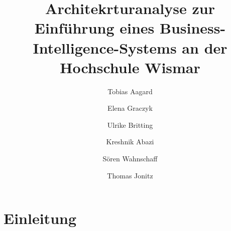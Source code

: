 \documentclass{../tex/hswthesis-wi}
\author{Tobias Aagard\and Elena Graczyk\and Ulrike Britting\and Kreshnik Abazi\and Sören Wahnschaff\and Thomas Jonitz}
\title{Architekrturanalyse zur Einführung eines Business-Intelligence-Systems an der Hochschule Wismar}
\date{\cc{Wismar, \today}}
\begin{document}
\maketitle

\section{Einleitung}
\lipsum
\end{document}
